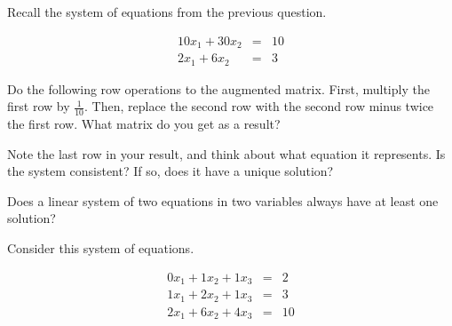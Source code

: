 





Recall the system of equations from the previous question.  



\begin{eqnarray*}
10x_1 + 30x_2 & = & 10 \\
2x_1 + 6x_2 & = & 3 
\end{eqnarray*}





Do the following row operations to the augmented matrix.  First, multiply the first row by 
$\frac{1}{10}$.   Then, replace the second row with the second
row minus twice the first row.  What matrix do you get as a result?  



\edXsolution{ 
}

\endedxproblem




Note the last row in your result, and think about what equation it represents.  
Is the system consistent?  If so, does it have a unique solution?  


\edXsolution{ 
}

\endedxproblem


Does a linear system of two equations in two variables always have at least one solution?


\edXsolution{  }

\endedxproblem






Consider this system of equations.  



\begin{eqnarray*}
0x_1 + 1x_2 + 1x_3 & = & 2 \\
1x_1 + 2x_2 + 1x_3 & = & 3 \\
2x_1 + 6x_2 + 4x_3 & = & 10 \\
\end{eqnarray*}






